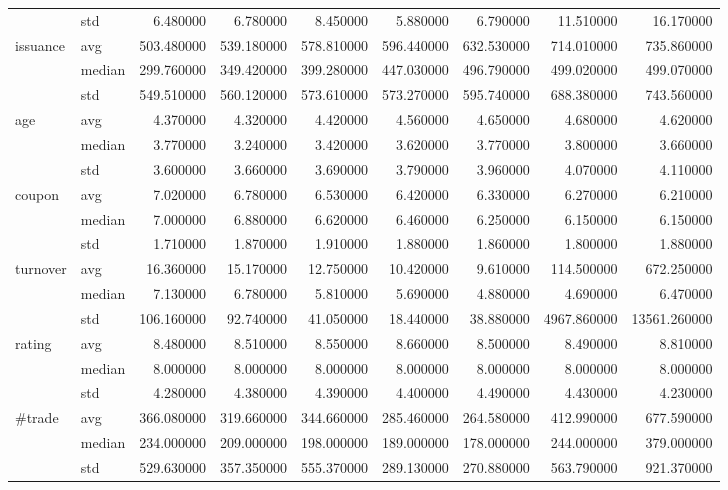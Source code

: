 \documentclass{article}
\begin{document}
\begin{landscape}
\begin{table}[ht]
\begin{tabular}{llrrrrrrr}
 & std & 6.480000 & 6.780000 & 8.450000 & 5.880000 & 6.790000 & 11.510000 & 16.170000 \\
\cline{1-9}
\multirow[t]{3}{*}{issuance} & avg & 503.480000 & 539.180000 & 578.810000 & 596.440000 & 632.530000 & 714.010000 & 735.860000 \\
 & median & 299.760000 & 349.420000 & 399.280000 & 447.030000 & 496.790000 & 499.020000 & 499.070000 \\
 & std & 549.510000 & 560.120000 & 573.610000 & 573.270000 & 595.740000 & 688.380000 & 743.560000 \\
\cline{1-9}
\multirow[t]{3}{*}{age} & avg & 4.370000 & 4.320000 & 4.420000 & 4.560000 & 4.650000 & 4.680000 & 4.620000 \\
 & median & 3.770000 & 3.240000 & 3.420000 & 3.620000 & 3.770000 & 3.800000 & 3.660000 \\
 & std & 3.600000 & 3.660000 & 3.690000 & 3.790000 & 3.960000 & 4.070000 & 4.110000 \\
\cline{1-9}
\multirow[t]{3}{*}{coupon} & avg & 7.020000 & 6.780000 & 6.530000 & 6.420000 & 6.330000 & 6.270000 & 6.210000 \\
 & median & 7.000000 & 6.880000 & 6.620000 & 6.460000 & 6.250000 & 6.150000 & 6.150000 \\
 & std & 1.710000 & 1.870000 & 1.910000 & 1.880000 & 1.860000 & 1.800000 & 1.880000 \\
\cline{1-9}
\multirow[t]{3}{*}{turnover} & avg & 16.360000 & 15.170000 & 12.750000 & 10.420000 & 9.610000 & 114.500000 & 672.250000 \\
 & median & 7.130000 & 6.780000 & 5.810000 & 5.690000 & 4.880000 & 4.690000 & 6.470000 \\
 & std & 106.160000 & 92.740000 & 41.050000 & 18.440000 & 38.880000 & 4967.860000 & 13561.260000 \\
\cline{1-9}
\multirow[t]{3}{*}{rating} & avg & 8.480000 & 8.510000 & 8.550000 & 8.660000 & 8.500000 & 8.490000 & 8.810000 \\
 & median & 8.000000 & 8.000000 & 8.000000 & 8.000000 & 8.000000 & 8.000000 & 8.000000 \\
 & std & 4.280000 & 4.380000 & 4.390000 & 4.400000 & 4.490000 & 4.430000 & 4.230000 \\
\cline{1-9}
\multirow[t]{3}{*}{#trade} & avg & 366.080000 & 319.660000 & 344.660000 & 285.460000 & 264.580000 & 412.990000 & 677.590000 \\
 & median & 234.000000 & 209.000000 & 198.000000 & 189.000000 & 178.000000 & 244.000000 & 379.000000 \\
 & std & 529.630000 & 357.350000 & 555.370000 & 289.130000 & 270.880000 & 563.790000 & 921.370000 \\
\cline{1-9}
\bottomrule
\end{tabular}


\end{table}

\end{landscape}
\end{document}
